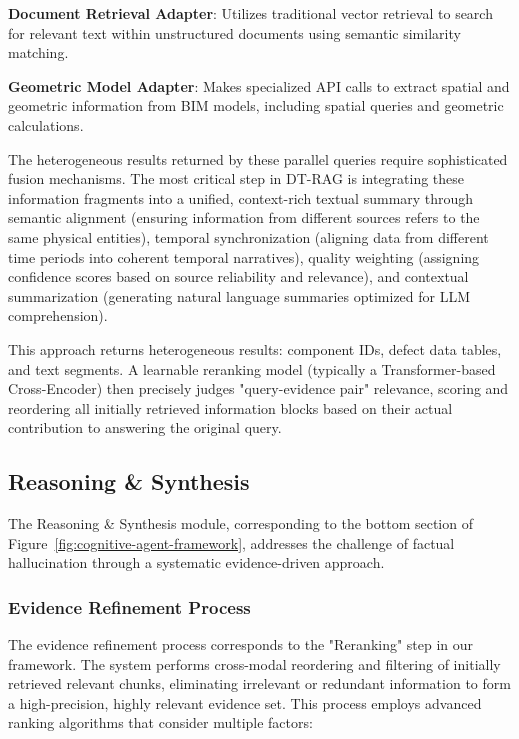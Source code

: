 \textbf{Document Retrieval Adapter}: Utilizes traditional vector retrieval to search for relevant text within unstructured documents using semantic similarity matching.

\textbf{Geometric Model Adapter}: Makes specialized API calls to extract spatial and geometric information from BIM models, including spatial queries and geometric calculations.

The heterogeneous results returned by these parallel queries require sophisticated fusion mechanisms. The most critical step in DT-RAG is integrating these information fragments into a unified, context-rich textual summary through semantic alignment (ensuring information from different sources refers to the same physical entities), temporal synchronization (aligning data from different time periods into coherent temporal narratives), quality weighting (assigning confidence scores based on source reliability and relevance), and contextual summarization (generating natural language summaries optimized for LLM comprehension).

This approach returns heterogeneous results: component IDs, defect data tables, and text segments. A learnable reranking model (typically a Transformer-based Cross-Encoder) then precisely judges "query-evidence pair" relevance, scoring and reordering all initially retrieved information blocks based on their actual contribution to answering the original query.

\subsection{Reasoning \& Synthesis}

The Reasoning \& Synthesis module, corresponding to the bottom section of Figure~\ref{fig:cognitive-agent-framework}, addresses the challenge of factual hallucination through a systematic evidence-driven approach.

\subsubsection{Evidence Refinement Process}

The evidence refinement process corresponds to the "Reranking" step in our framework. The system performs cross-modal reordering and filtering of initially retrieved relevant chunks, eliminating irrelevant or redundant information to form a high-precision, highly relevant evidence set. This process employs advanced ranking algorithms that consider multiple factors:

